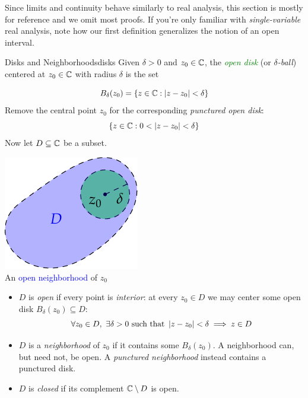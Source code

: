 Since limits and continuity behave similarly to real analysis, this section is mostly for reference and we omit most proofs. If you're only familiar with \emph{single-variable} real analysis, note how our first definition generalizes the notion of an open interval.


\begin{defn}{Disks and Neighborhoods}{disks}
	Given $\delta>0$ and $z_0\in\mathbb{C}$, the \emph{\textcolor{Green}{open disk}} (or \emph{$\delta$-ball}) centered at $z_0\in\mathbb{C}$ with radius $\delta$ is the set\par
	\begin{minipage}[t]{0.7\linewidth}\vspace{-15pt}
		\[
			B_\delta(z_0)=\{z\in\mathbb{C}:\left| z-z_0\right|<\delta\}
		\]
		Remove the central point $z_0$ for the corresponding \emph{punctured open disk}:
		\[
			\{z\in\mathbb{C}:0<\left| z-z_0\right|<\delta\}
		\]
		Now let $D\subseteq\mathbb{C}$ be a subset.
	\end{minipage}
	\hfill
	\begin{minipage}[t]{0.29\linewidth}\vspace{-16pt}
		\centering%
		\includegraphics[scale=0.95]{functions-open}\\
		An \textcolor{blue}{open neighborhood} of $z_0$
	\end{minipage}
	\par\vspace{-5pt}
	\begin{itemize}\itemsep0pt
		\item $D$ is \emph{open} if every point is \emph{interior}: at every $z_0\in D$ we may center some open disk $B_\delta(z_0)\subseteq D$:\vspace{-2pt}
		\[
			\forall z_0\in D, \ \exists \delta>0\text{ such that } \left| z-z_0\right|<\delta\implies z\in D
		\]\vspace{-20pt}
		\item $D$ is a \emph{neighborhood} of $z_0$ if it contains some $B_\delta(z_0)$. A neighborhood can, but need not, be open. A \emph{punctured neighborhood} instead contains a punctured disk.
		\item $D$ is \emph{closed} if its complement $\mathbb{C}\setminus D$ is open.
	\end{itemize}
\end{defn}

